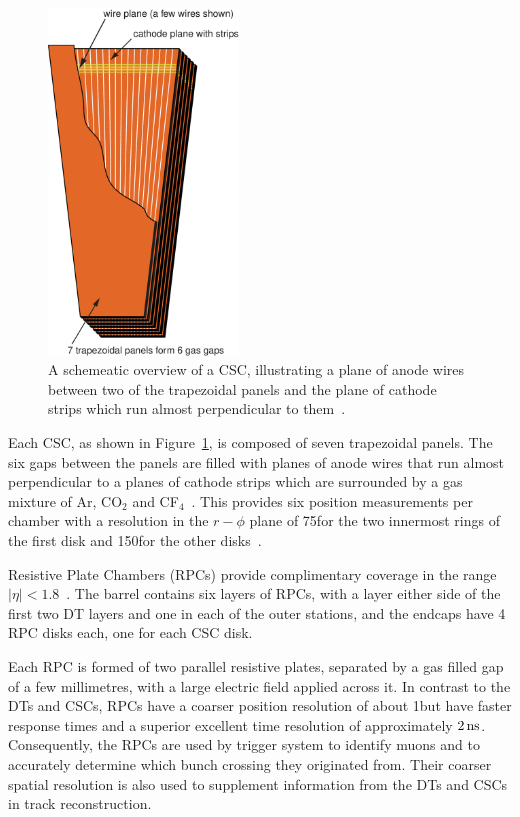 \begin{figure}[htb]
\begin{center}
\includegraphics[width=0.45\textwidth]{figs/cms/csc_trapezoid_v1.pdf}
\caption{A schemeatic overview of a CSC, illustrating a plane of anode wires between two of the trapezoidal panels and the plane of cathode strips which run almost perpendicular to them~\cite{Bayatian:2006nff}.}
\label{fig:csc}
\end{center}
\end{figure}

Each CSC, as shown in Figure~\ref{fig:csc}, is composed of seven trapezoidal panels. 
The six gaps between the panels are filled with planes of anode wires that run almost perpendicular to a planes of cathode strips which are surrounded by a gas mixture of Ar, CO$_{2}$ and CF$_{4}$~\cite{Anderson:2004ep}.
This provides six position measurements per chamber with a resolution in the $r-\phi$ plane of 75\mum for the two innermost rings of the first disk and 150\mum for the other disks~\cite{CMS:1997iti}.

Resistive Plate Chambers (RPCs) provide complimentary coverage in the range $|\eta| < 1.8$~\cite{Battilana:2017mrm}.
The barrel contains six layers of RPCs, with a layer either side of the first two DT layers and one in each of the outer stations, and the endcaps have 4 RPC disks each, one for each CSC disk.

Each RPC is formed of two parallel resistive plates, separated by a gas filled gap of a few millimetres, with a large electric field applied across it.
In contrast to the DTs and CSCs, RPCs have a coarser position resolution of about 1\cm but have faster response times and a superior excellent time resolution of approximately $2\text{\,ns}$.
Consequently, the RPCs are used by trigger system to identify muons and to accurately determine which bunch crossing they originated from.
Their coarser spatial resolution is also used to supplement information from the DTs and CSCs in track reconstruction.

